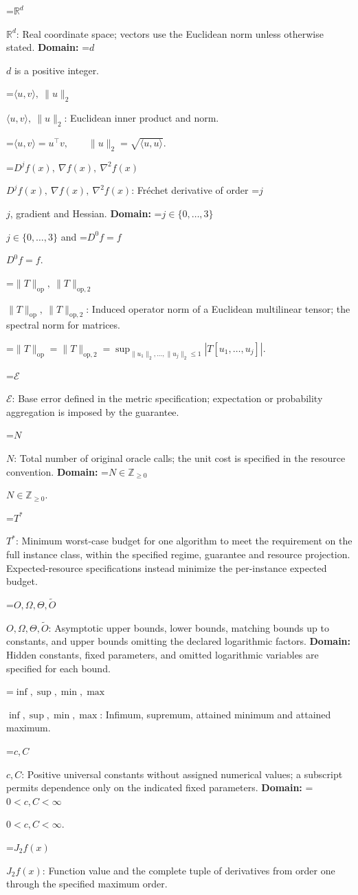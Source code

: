 \documentclass[10pt,a4paper]{article}
\newcommand{\AtlasMath}[1]{\par\begingroup\centering\setbox0=\hbox{$\displaystyle #1$}\ifdim\wd0>1.4\linewidth\typeout{ATLAS WIDE FORMULA: \the\wd0}\fi\ifdim\wd0>\linewidth\resizebox{\linewidth}{!}{\box0}\else\box0\fi\par\endgroup}
\newcommand{\AtlasInlineMath}[1]{\begingroup\setbox0=\hbox{$#1$}\ifdim\wd0>.4\linewidth\endgroup\AtlasMath{#1}\else\endgroup$#1$\fi}
\begin{document}
\AtlasInlineMath{\mathbb{R}^d}: Real coordinate space; vectors use the Euclidean norm unless otherwise stated. \textbf{Domain:} \AtlasInlineMath{d} is a positive integer.

\AtlasInlineMath{\langle u,v\rangle,\ \|u\|_2}: Euclidean inner product and norm.


\AtlasMath{\langle u,v\rangle=u^\top v,\qquad\|u\|_2=\sqrt{\langle u,u\rangle}.}


\AtlasInlineMath{D^jf(x),\ \nabla f(x),\ \nabla^2f(x)}: Fréchet derivative of order \AtlasInlineMath{j}, gradient and Hessian. \textbf{Domain:} \AtlasInlineMath{j\in\{0,\ldots,3\}} and \AtlasInlineMath{D^0f=f}.

\AtlasInlineMath{\|T\|_{\mathrm{op}},\ \|T\|_{\mathrm{op},2}}: Induced operator norm of a Euclidean multilinear tensor; the spectral norm for matrices.


\AtlasMath{\|T\|_{\mathrm{op}}=\|T\|_{\mathrm{op},2}=\sup_{\|u_1\|_2,\ldots,\|u_j\|_2\le1}|T[u_1,\ldots,u_j]|.}


\AtlasInlineMath{\mathcal{E}}: Base error defined in the metric specification; expectation or probability aggregation is imposed by the guarantee.

\AtlasInlineMath{N}: Total number of original oracle calls; the unit cost is specified in the resource convention. \textbf{Domain:} \AtlasInlineMath{N\in\mathbb{Z}_{\ge0}}.

\AtlasInlineMath{T^*}: Minimum worst-case budget for one algorithm to meet the requirement on the full instance class, within the specified regime, guarantee and resource projection. Expected-resource specifications instead minimize the per-instance expected budget.

\AtlasInlineMath{O,\Omega,\Theta,\widetilde{O}}: Asymptotic upper bounds, lower bounds, matching bounds up to constants, and upper bounds omitting the declared logarithmic factors. \textbf{Domain:} Hidden constants, fixed parameters, and omitted logarithmic variables are specified for each bound.

\AtlasInlineMath{\inf,\sup,\min,\max}: Infimum, supremum, attained minimum and attained maximum.

\AtlasInlineMath{c,C}: Positive universal constants without assigned numerical values; a subscript permits dependence only on the indicated fixed parameters. \textbf{Domain:} \AtlasInlineMath{0<c,C<\infty}.

\AtlasInlineMath{J_{2}f(x)}: Function value and the complete tuple of derivatives from order one through the specified maximum order.
\end{document}

